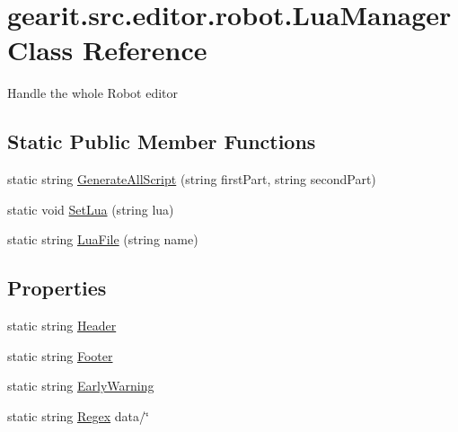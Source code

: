 \hypertarget{classgearit_1_1src_1_1editor_1_1robot_1_1_lua_manager}{\section{gearit.\+src.\+editor.\+robot.\+Lua\+Manager Class Reference}
\label{classgearit_1_1src_1_1editor_1_1robot_1_1_lua_manager}
}


Handle the whole Robot editor  


\subsection*{Static Public Member Functions}
\begin{DoxyCompactItemize}
\item 
static string \hyperlink{classgearit_1_1src_1_1editor_1_1robot_1_1_lua_manager_a9ef8e1dd3db359e7c872adf35b8b749e}{Generate\+All\+Script} (string first\+Part, string second\+Part)
\item 
static void \hyperlink{classgearit_1_1src_1_1editor_1_1robot_1_1_lua_manager_a8ec651edddcd933a3038811fc31089ba}{Set\+Lua} (string lua)
\item 
static string \hyperlink{classgearit_1_1src_1_1editor_1_1robot_1_1_lua_manager_a79ad0d31e32aefaf02b8c134ff0f8f2c}{Lua\+File} (string name)
\end{DoxyCompactItemize}
\subsection*{Properties}
\begin{DoxyCompactItemize}
\item 
static string \hyperlink{classgearit_1_1src_1_1editor_1_1robot_1_1_lua_manager_a97a912f9652a6f7d43eabf8339f48cc1}{Header}
\item 
static string \hyperlink{classgearit_1_1src_1_1editor_1_1robot_1_1_lua_manager_a9cdcd2f0f1c6756eeca0791c3f444345}{Footer}
\item 
static string \hyperlink{classgearit_1_1src_1_1editor_1_1robot_1_1_lua_manager_a1f442a49fa85984b31c043ff16c2fc53}{Early\+Warning}
\item 
static string \hyperlink{classgearit_1_1src_1_1editor_1_1robot_1_1_lua_manager_a21a92da7a2584882102819b50d0381e1}{Regex} data/\char`\"{}
\end{DoxyCompactItemize}


